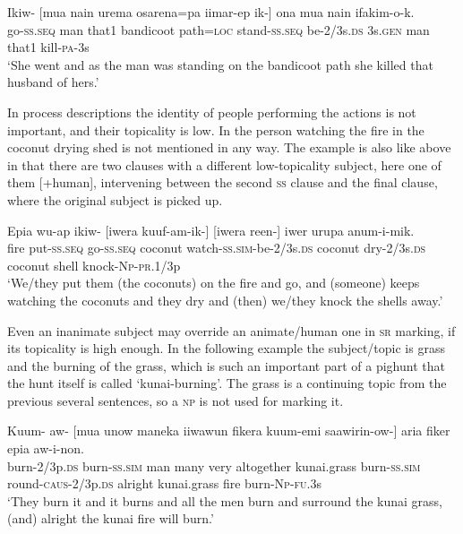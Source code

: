 \ea%
\label{ex:8:x1478}
\gll Ikiw-  [mua  nain  urema  osarena=pa  iimar-ep ik-] ona  mua  nain  ifakim-o-k. \\
go-\textsc{ss}.\textsc{seq} man  that1 bandicoot path=\textsc{loc} stand-\textsc{ss}.\textsc{seq} be-2/3s.\textsc{ds} 3s.\textsc{gen} man  that1 kill-\textsc{pa}-3s\\
\glt`She went and as the man was standing on the bandicoot path she killed that husband of hers.'
\z

  
In process descriptions the identity of people performing the actions is not important, and their topicality is low. In  the person watching the fire in the coconut drying shed is not mentioned in any way. The example is also like  above in that there are two clauses with a different low-topicality subject, here one of them [+human], intervening between the second \textsc{ss} clause and the final clause, where the original subject is picked up.

\ea%
\label{ex:8:x1481}
\gll Epia  wu-ap  ikiw- [iwera  kuuf-am-ik-] [iwera  reen-] iwer  urupa  anum-i-mik.  \\
fire  put-\textsc{ss}.\textsc{seq} go-\textsc{ss}.\textsc{seq} coconut  watch-\textsc{ss}.\textsc{sim}-be-2/3s.\textsc{ds} coconut  dry-2/3s.\textsc{ds} coconut shell knock-\textsc{Np}-\textsc{pr}.1/3p     \\
\glt`We/they put them (the coconuts) on the fire and go, and (someone) keeps watching the coconuts and they dry and (then) we/they knock the shells away.'
\z


Even an inanimate subject may override an animate/human one in \textsc{sr} marking, if its topicality is high enough. In the following example the subject/topic is  grass and the burning of the grass, which is such an important part of a pighunt that the hunt itself is called  `kunai-burning'.  The grass is a continuing topic from the previous several sentences, so a \textsc{np} is not used for marking it. 

\ea%
\label{ex:8:x1479}
\gll Kuum-  aw-  [mua  unow  maneka  iiwawun  fikera kuum-emi  saawirin-ow-]  aria  fiker  epia aw-i-non.\\
burn-2/3p.\textsc{ds}  burn-\textsc{ss}.\textsc{sim} man many very altogether kunai.grass burn-\textsc{ss}.\textsc{sim} round-\textsc{caus}-2/3p.\textsc{ds} alright  kunai.grass  fire burn-\textsc{Np}-\textsc{fu}.3s\\
\glt`They burn it and it burns and all the men burn and surround the kunai grass, (and) alright the kunai fire will burn.'
\z


